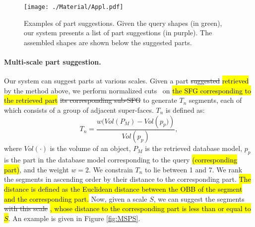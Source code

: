 \begin{figure}[t]\centering
\texttt{[image: ./Material/Appl.pdf]}
\caption{Examples of part suggestions. Given the query shapes (in green), our system presents a list of part suggestions (in purple). The assembled shapes are shown below the suggested parts.}\label{fig:appl}
\end{figure}

\paragraph*{Multi-scale part suggestion.} Our system can suggest parts at various scales. Given a part \st{suggested} \hl{retrieved} by the method above, we perform normalized cuts~\cite{randomizedcutsfunkhousertog2008} on \hl{the SFG corresponding to the retrieved part} \st{its corresponding sub-SFG} to generate $T_n$ segments, each of which consists of a group of adjacent super-faces. $T_n$ is defined as:
\[{T_n} = \frac{{w(Vol(P_M)-Vol\left( {{p_p})} \right)}}{{Vol\left( {{p_p}} \right)}},\] where $Vol\left( \cdot \right)$ is the volume of an object, $P_M$ is the retrieved database model, $p_p$ is the part in the database model corresponding to the query \hl{(corresponding part)}, and the weight $w = 2$. We constrain $T_n$ to lie between 1 and 7. We rank the segments in ascending order by their distance to the corresponding part. \hl{The distance is defined as the Euclidean distance between the OBB of the segment and the corresponding part.} Now, given a scale $S$, we can suggest the segments \st{with this scale} \hl{, whose distance to the corresponding part is less than or equal to $S$}. An example is given in Figure \ref{fig:MSPS}.

